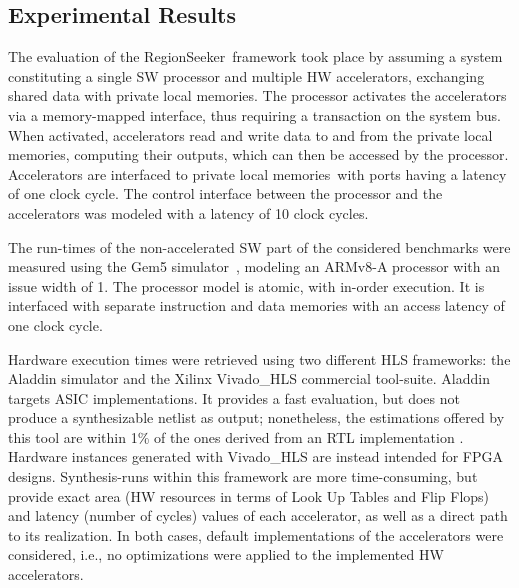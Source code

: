 \documentclass[]{usiinfthesis}
\newcommand{\rseeker}{{RegionSeeker}}
\newcommand{\plms}{{private local memories}}
\begin{document}
\subsection{Experimental Results}
\label{subsec:exp}


The evaluation of the \rseeker\ framework took place by 
assuming a system constituting a single SW processor and multiple HW accelerators, 
exchanging shared data with \plms.
The processor activates the accelerators via a memory-mapped
interface, thus requiring a transaction on the system bus. 
When activated, accelerators read and
write data to and from the \plms, computing their outputs, which
can then be accessed by the processor. Accelerators are interfaced to \plms\
with ports having a latency of one clock cycle. The
control interface between the processor and the accelerators was modeled 
with a
latency of 10 clock cycles.\par

The run-times of the non-accelerated SW part of the considered
benchmarks were measured using the Gem5
simulator~\cite{BinkertFeb11}, modeling an ARMv8-A processor with an
issue width of 1. The processor model is atomic, with in-order
execution. It is interfaced with separate instruction and data
memories with an access latency of one clock cycle.\par

Hardware execution times were retrieved using two different HLS 
frameworks: the Aladdin simulator and the Xilinx Vivado\_HLS
commercial tool-suite.  Aladdin targets ASIC implementations.  It
provides a fast evaluation, but does not produce a synthesizable netlist
as output; nonetheless, the estimations offered by this tool are
within 1\% of the ones derived from an RTL implementation
\cite{ShaoJul14}.  Hardware instances generated with Vivado\_HLS are
instead intended for FPGA designs. Synthesis-runs within this
framework are more time-consuming, but provide exact area (HW resources
in terms of Look Up Tables and Flip Flops)
and latency (number of cycles) values of each accelerator, as well as a direct
path to its realization.  In both cases, default implementations of
the accelerators were considered, i.e., no optimizations were applied to the
implemented HW accelerators.\par
\end{document}

